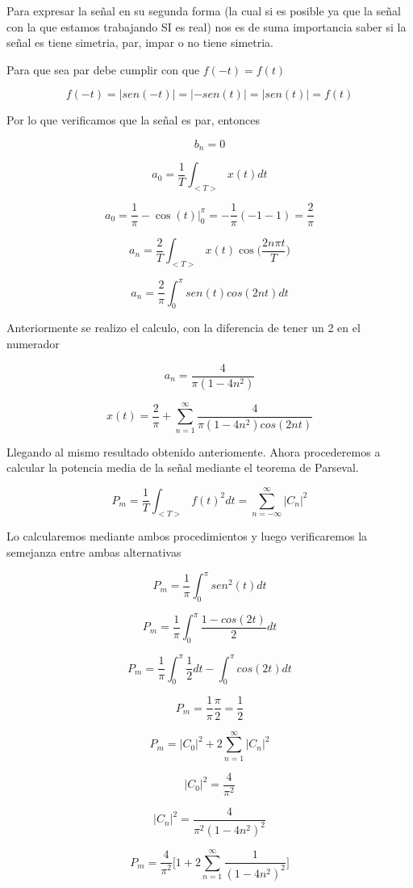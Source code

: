 Para expresar la se\~nal en su segunda forma (la cual si es posible ya que la se\~nal con la que estamos trabajando SI es real) nos es de suma importancia saber si la se\~nal es tiene simetria, par, impar o no tiene simetria.

Para que sea par debe cumplir con que $f(-t) = f(t)$

$$f(-t) = |sen(-t)| = |-sen(t)| = |sen(t)| = f(t) $$

Por lo que verificamos que la se\~nal es par, entonces

$$b_n = 0 $$

$$a_0 = \dfrac{1}{T} \int_{<T>} x(t) dt $$

$$a_0 = \dfrac{1}{\pi} -\cos (t) \bigg\rvert_{0}^{\pi} = -\dfrac{1}{\pi} (-1-1) = \dfrac{2}{\pi} $$

$$a_n = \dfrac{2}{T} \int_{<T>} x(t) \cos \bigg(\dfrac{2n\pi t}{T} \bigg) $$

$$a_n = \dfrac{2}{\pi} \int_{0}^{\pi} sen(t) cos(2nt) dt $$

Anteriormente se realizo el calculo, con la diferencia de tener un 2 en el numerador

$$a_n = \dfrac{4}{\pi(1-4n^2)} $$

\[x(t) = \dfrac{2}{\pi} + \sum_{n=1}^{\infty} \dfrac{4}{\pi(1-4n^2) cos(2nt)} \]

Llegando al mismo resultado obtenido anteriomente. Ahora procederemos a calcular la potencia media de la se\~nal mediante el teorema de Parseval.

\[P_m = \dfrac{1}{T} \int_{<T>} f(t)^2 dt = \sum_{n=-\infty}^{\infty} |C_n|^2 \]

Lo calcularemos mediante ambos procedimientos y luego verificaremos la semejanza entre ambas alternativas

$$P_m = \dfrac{1}{\pi} \int_{0}^{\pi} sen^2 (t) dt $$

$$P_m = \dfrac{1}{\pi} \int_{0}^{\pi} \dfrac{1-cos(2t)}{2} dt$$

$$P_m = \dfrac{1}{\pi} \int_{0}^{\pi} \dfrac{1}{2} dt - \int_{0}^{\pi} cos(2t) dt $$

$$P_m = \dfrac{1}{\pi} \dfrac{\pi}{2} = \dfrac{1}{2} $$

\[P_m = |C_0|^2 + 2 \sum_{n=1}^{\infty} |C_n|^2 \]

$$|C_0|^2 = \dfrac{4}{\pi^2} $$

$$|C_n|^2 = \dfrac{4}{\pi^2(1-4n^2)^2} $$

\[P_m = \dfrac{4}{\pi^2} \bigg[1 + 2\sum_{n=1}^{\infty} \dfrac{1}{(1-4n^2)^2} \bigg] \]

